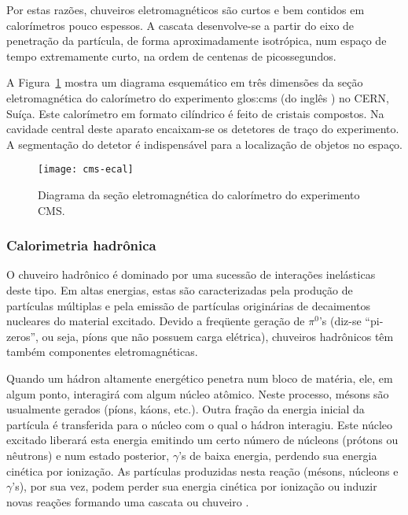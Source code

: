 Por estas razões, chuveiros eletromagnéticos são curtos e bem contidos em
calorímetros pouco espessos. A cascata desenvolve-se a partir do eixo de
penetração da par\-tí\-cu\-la, de forma aproximadamente isotrópica, num espaço
de tempo extremamente curto, na ordem de centenas de picossegundos.

A Figura~\ref{fig:cms-ecal} mostra um diagrama esquemático em três dimensões
da seção eletromagnética do calorímetro do experimento \gls{glos:cms} (do inglês
) no CERN, Suíça. Este calorímetro em formato
cilíndrico é feito de cristais compostos. Na cavidade central deste aparato
encaixam-se os detetores de traço do experimento. A segmentação do detetor é
indispensável para a localização de objetos no espaço.

\begin{figure}
\begin{center}
\texttt{[image: cms-ecal]}
\end{center}
\caption{Diagrama da seção eletromagnética do calorímetro do experimento CMS.}
\label{fig:cms-ecal}
\end{figure}

\subsubsection{Calorimetria hadrônica}
\label{sec:calohad}

O chuveiro hadrônico é dominado por uma sucessão de interações inelásticas
deste tipo. Em altas energias, estas são caracterizadas pela produção de
partículas múltiplas e pela emissão de partículas originárias de decaimentos
nucleares do material excitado. Devido a freqüente geração de $\pi^{0}$'s
(diz-se ``pi-zeros'', ou seja, píons que não possuem carga elétrica),
chuveiros hadrônicos têm também componentes eletromagnéticas.

Quando um hádron altamente ener\-gé\-tico penetra num bloco de ma\-té\-ria,
ele, em algum ponto, interagi\-rá com algum nú\-cleo atômico. Neste processo,
mésons são usualmente gerados (píons, káons, etc.). Outra fração da energia
inicial da partícula é transferida para o núcleo com o qual o hádron
interagiu. Este núcleo excitado liberará esta energia emitindo um certo
nú\-mero de nú\-cleons (prótons ou nêutrons) e num estado posterior,
$\gamma$'s de baixa energia, perdendo sua energia cinética por ionização. As
partículas produzidas nesta reação (mésons, núcleons e $\gamma$'s), por sua
vez, podem perder sua energia cinética por ionização ou induzir novas reações
formando uma cascata ou chuveiro \cite{hadcal}.

